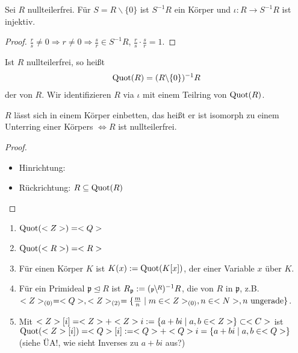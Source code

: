 \begin{conclusion}
	Sei $R$ nullteilerfrei. Für $S = R \backslash \{0\}$ ist $S^{-1}R$ ein Körper und $\iota: R \to S^{-1}R$ ist injektiv.
\end{conclusion}

\begin{proof}
	$\frac{r}{s} \neq 0 \Rightarrow r \neq 0 \Rightarrow \frac{s}{r} \in S^{-1}R$, $\frac{r}{s}\cdot \frac{s}{r} = 1.$
\end{proof}

\begin{definition}
	Ist $R$ nullteilerfrei, so heißt
	\begin{align}
		\operatorname{Quot}(R) = (R\backslash \{0\})^{-1}R\notag
	\end{align}
	der  von $R$. Wir identifizieren $R$ via $\iota$ mit einem Teilring von $\operatorname{Quot}(R)$.
\end{definition}

\begin{conclusion}
	$R$ lässt sich in einem Körper einbetten, das heißt er ist isomorph zu einem Unterring einer Körpers $\Leftrightarrow R$ ist nullteilerfrei.
\end{conclusion}

\begin{proof}
	\begin{itemize}
	\item Hinrichtung: 
	\item Rückrichtung: $R \subseteq \operatorname{Quot}(R)$
	\end{itemize}
\end{proof}

\begin{example}
	\begin{enumerate}[label=(\alph*)]
	\item $\operatorname{Quot}(<Z>) = <Q>$
	\item $\operatorname{Quot}(<R>) = <R>$
	\item Für einen Körper $K$ ist $K(x) := \operatorname{Quot}(K[x])$, der  einer Variable $x$ über $K$.
	\item Für ein Primideal $\mathfrak{p} \unlhd R$ ist $R_{\mathfrak{p}} := (\rnkset{R}{\mathfrak{p}})^{-1}R$, die  von $R$ in $\mathfrak{p}$, z.B. $<Z>_{(0)} = <Q>, <Z>_{(2)} = \{\frac{m}{n} \mid m \in <Z>_{(0)}, n \in <N>, n \text{ ungerade}\}$.
	\item Mit $<Z>[i] = <Z>+<Z> i := \{a+bi \mid a,b \in <Z>\} \subset <C>$ ist $\operatorname{Quot}(<Z>[i]) = <Q>[i] := <Q> + <Q> i = \{a+bi \mid a,b \in <Q>\}$ (siehe ÜA!, wie sieht Inverses zu $a+b i $ aus?)
	\end{enumerate}
\end{example}

